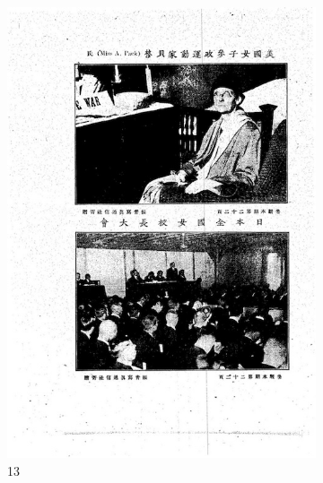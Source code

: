\documentclass[12pt,twoside]{report}
\begin{document}
\begin{appendices}
\begin{figure}[htbp]
    \begin{subfigure}[b]{0.23\linewidth}
        \includegraphics[width=\linewidth]{./figures/testset/13.jpg}
        \caption{13}
        \label{fig:test_13}
    \end{subfigure}
    \hfill
    \begin{subfigure}[b]{0.23\linewidth}

\end{subfigure}
\end{figure}
\end{appendices}
\end{document}
